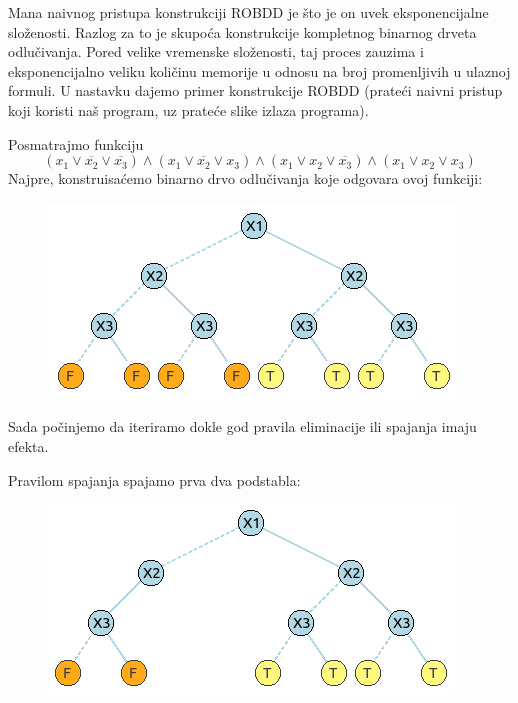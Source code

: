 Mana naivnog pristupa konstrukciji ROBDD je \v{s}to je on uvek eksponencijalne slo\v{z}enosti. Razlog za to je skupo\'c{}a konstrukcije kompletnog binarnog drveta odlu\v{c}ivanja. Pored velike vremenske slo\v{z}enosti, taj proces zauzima i eksponencijalno veliku koli\v{c}inu memorije u odnosu na broj promenljivih u ulaznoj formuli. U nastavku dajemo primer konstrukcije ROBDD (prate\'c{}i naivni pristup koji koristi na\v{s} program, uz prate\'c{}e slike izlaza programa).

\begin{exmp}
    Posmatrajmo funkciju
    $$(x_{1} \vee \overline{x_{2}} \vee \overline{x_{3}}) \wedge (x_{1} \vee \overline{x_{2}} \vee x_{3}) \wedge (x_{1} \vee x_{2} \vee \overline{x_{3}}) \wedge (x_{1} \vee x_{2} \vee x_{3})$$
    Najpre, konstruisa\'c{}emo binarno drvo odlu\v{c}ivanja koje odgovara ovoj funkciji:

    \begin{figure}[H]
        \centering
        \includegraphics{slike/primer/00.png}
    \end{figure}

    Sada po\v{c}injemo da iteriramo dokle god pravila eliminacije ili spajanja imaju efekta.

    Pravilom spajanja spajamo prva dva podstabla:

    \begin{figure}[H]
        \centering
        \includegraphics{slike/primer/01.png}
    \end{figure}


\end{exmp}
